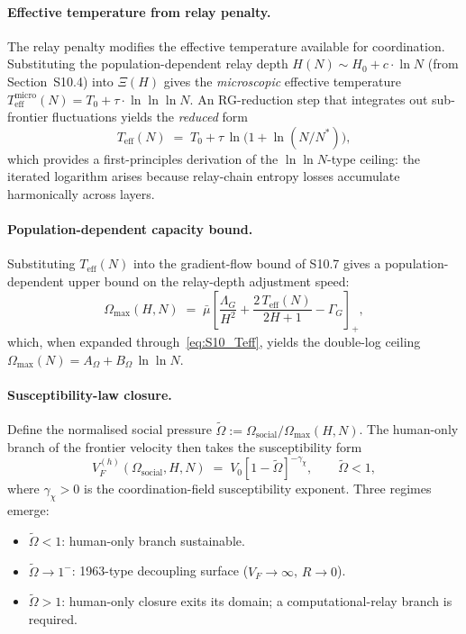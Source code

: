 \documentclass[11pt]{article}
\begin{document}
\paragraph{Effective temperature from relay penalty.}
The relay penalty modifies the effective temperature available for
coordination. Substituting the population-dependent relay depth
$H(N)\sim H_0 + c\cdot\ln N$ (from Section~S10.4) into $\Xi(H)$ gives the
\emph{microscopic} effective temperature
$T_{\mathrm{eff}}^{\mathrm{micro}}(N)=T_0+\tau\cdot\ln\!\ln\!\ln N$.
An RG-reduction step that integrates out sub-frontier fluctuations yields the
\emph{reduced} form
\begin{equation}
T_{\mathrm{eff}}(N) \;=\; T_0 + \tau\,\ln\!\bigl(1+\ln(N/N^*)\bigr),
\label{eq:S10_Teff}
\end{equation}
which provides a first-principles derivation of the $\ln\!\ln N$-type ceiling:
the iterated logarithm arises because relay-chain entropy losses accumulate
harmonically across layers.

\paragraph{Population-dependent capacity bound.}
Substituting $T_{\mathrm{eff}}(N)$ into the gradient-flow bound of S10.7
gives a population-dependent upper bound on the relay-depth adjustment speed:
\begin{equation}
\Omega_{\max}(H,N) \;=\;
\bar\mu\!\left[\frac{\Lambda_G}{H^2}
+ \frac{2\,T_{\mathrm{eff}}(N)}{2H+1}
- \Gamma_G\right]_{\!+},
\label{eq:S10_Omega_max}
\end{equation}
which, when expanded through~\eqref{eq:S10_Teff}, yields the double-log
ceiling $\Omega_{\max}(N) = A_\Omega + B_\Omega\,\ln\!\ln N$.

\paragraph{Susceptibility-law closure.}
Define the normalised social pressure
$\tilde\Omega := \Omega_{\mathrm{social}}/\Omega_{\max}(H,N)$.
The human-only branch of the frontier velocity then takes the susceptibility
form
\begin{equation}
V_F^{(h)}(\Omega_{\mathrm{social}},H,N) \;=\;
V_0\!\left[1 - \tilde\Omega\right]^{-\gamma_\chi},
\qquad \tilde\Omega < 1,
\label{eq:S10_VF_closure}
\end{equation}
where $\gamma_\chi > 0$ is the coordination-field susceptibility exponent.
Three regimes emerge:
\begin{itemize}
\item $\tilde\Omega < 1$: human-only branch sustainable.
\item $\tilde\Omega \to 1^-$: 1963-type decoupling surface
($V_F\to\infty$, $R\to 0$).
\item $\tilde\Omega > 1$: human-only closure exits its domain;
a computational-relay branch is required.
\end{itemize}
\end{document}
